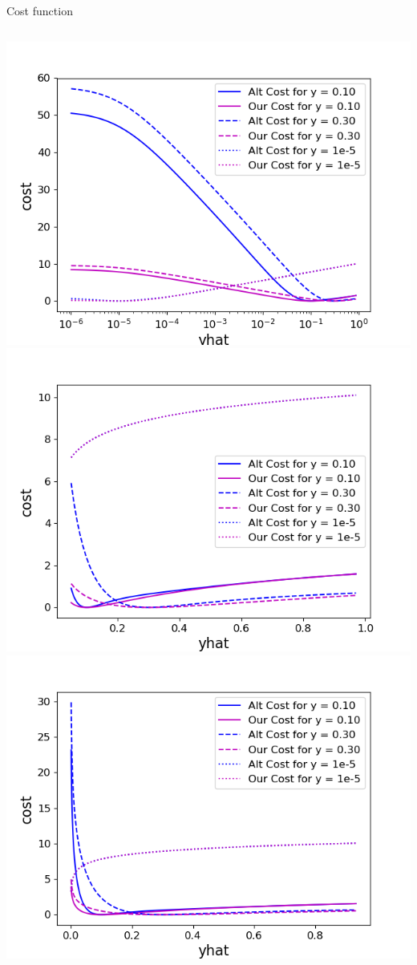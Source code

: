 \begin{frame}{Cost function}
  \begin{columns}[c]
    \centering
    \includegraphics[width=\textwidth]{images/AltCostPlot_181015.png}
    \centering
    \includegraphics[width=\textwidth]{images/AltCostPlot_181015_linearA.png}
    \centering
    \includegraphics[width=\textwidth]{images/AltCostPlot_181015_linear.png}
    \end{columns}
\end{frame}
